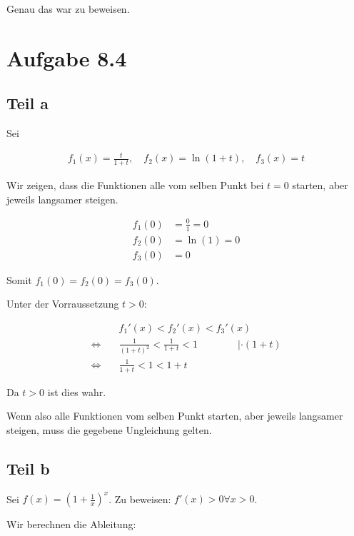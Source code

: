 \documentclass[a4paper,german,12pt,smallheadings]{scrartcl}
\begin{document}
Genau das war zu beweisen.

\section*{Aufgabe 8.4}

\subsection*{Teil a}
Sei

\begin{align*}
  f_1(x) = \frac{t}{1+t}, \quad f_2(x) = \ln(1+t), \quad f_3(x) = t
\end{align*}

Wir zeigen, dass die Funktionen alle vom selben Punkt bei $t=0$ starten, aber
jeweils langsamer steigen.

\begin{align*}
  f_1(0) &= \frac{0}{1} = 0 \\
  f_2(0) &= \ln(1) = 0 \\
  f_3(0) &= 0
\end{align*}

Somit $f_1(0) = f_2(0) = f_3(0)$.

Unter der Vorraussetzung $t>0$:

\begin{align*}
&f_1'(x) < f_2'(x) < f_3'(x) \\
\Leftrightarrow\quad&\frac{1}{(1+t)^2} < \frac{1}{1+t} < 1 \qquad\qquad | \cdot (1+t) \\
\Leftrightarrow\quad&\frac{1}{1+t} < 1 < 1+t
\end{align*}

Da $t > 0$ ist dies wahr.

Wenn also alle Funktionen vom selben Punkt starten, aber jeweils langsamer
steigen, muss die gegebene Ungleichung gelten.

\subsection*{Teil b}

Sei $f(x) = \left(1+\frac{1}{x}\right)^x$. Zu beweisen: $f'(x) > 0 \forall x > 0$.

Wir berechnen die Ableitung:
\end{document}
